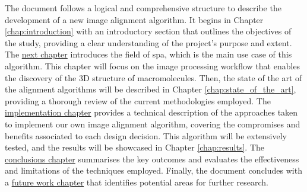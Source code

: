 \documentclass[../main.tex]{subfiles}
\begin{document}
The document follows a logical and comprehensive structure to describe the development of a new image alignment algorithm. It begins in Chapter \ref{chap:introduction} with an introductory section that outlines the objectives of the study, providing a clear understanding of the project's purpose and extent. The \hyperlink{chap:spa}{next chapter} introduces the field of \gls{spa}, which is the main use case of this algorithm. This chapter will focus on the image processing workflow that enables the discovery of the 3D structure of macromolecules. Then, the state of the art of the alignment algorithms will be described in Chapter \ref{chap:state_of_the_art}, providing a thorough review of the current methodologies employed. The \hyperlink{chap:implementation}{implementation chapter} provides a technical description of the approaches taken to implement our own image alignment algorithm, covering the compromises and benefits associated to each design decision. This algorithm will be extensively tested, and the results will be showcased in Chapter \ref{chap:results}. The \hyperlink{chap:conclusions}{conclusions chapter} summarises the key outcomes and evaluates the effectiveness and limitations of the techniques employed. Finally, the document concludes with a \hyperlink{chap:future}{future work chapter} that identifies potential areas for further research.
\end{document}
